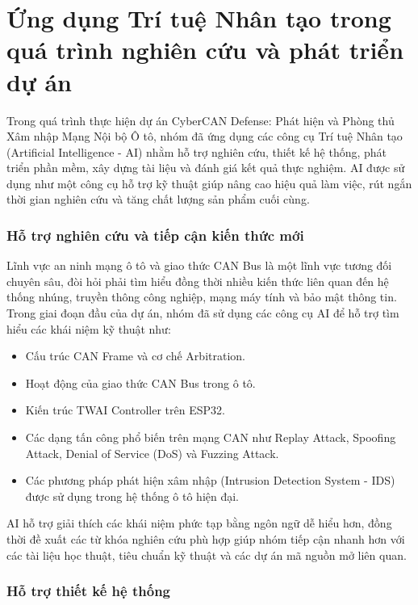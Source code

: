 \chapter{Ứng dụng Trí tuệ Nhân tạo trong quá trình nghiên cứu và phát triển dự án}

Trong quá trình thực hiện dự án CyberCAN Defense: Phát hiện và Phòng thủ Xâm nhập Mạng Nội bộ Ô tô, nhóm đã ứng dụng các công cụ Trí tuệ Nhân tạo (Artificial Intelligence - AI) nhằm hỗ trợ nghiên cứu, thiết kế hệ thống, phát triển phần mềm, xây dựng tài liệu và đánh giá kết quả thực nghiệm. AI được sử dụng như một công cụ hỗ trợ kỹ thuật giúp nâng cao hiệu quả làm việc, rút ngắn thời gian nghiên cứu và tăng chất lượng sản phẩm cuối cùng.

\subsection{Hỗ trợ nghiên cứu và tiếp cận kiến thức mới}

Lĩnh vực an ninh mạng ô tô và giao thức CAN Bus là một lĩnh vực tương đối chuyên sâu, đòi hỏi phải tìm hiểu đồng thời nhiều kiến thức liên quan đến hệ thống nhúng, truyền thông công nghiệp, mạng máy tính và bảo mật thông tin. Trong giai đoạn đầu của dự án, nhóm đã sử dụng các công cụ AI để hỗ trợ tìm hiểu các khái niệm kỹ thuật như:

\begin{itemize}
	\item Cấu trúc CAN Frame và cơ chế Arbitration.
	\item Hoạt động của giao thức CAN Bus trong ô tô.
	\item Kiến trúc TWAI Controller trên ESP32.
	\item Các dạng tấn công phổ biến trên mạng CAN như Replay Attack, Spoofing Attack, Denial of Service (DoS) và Fuzzing Attack.
	\item Các phương pháp phát hiện xâm nhập (Intrusion Detection System - IDS) được sử dụng trong hệ thống ô tô hiện đại.
\end{itemize}

AI hỗ trợ giải thích các khái niệm phức tạp bằng ngôn ngữ dễ hiểu hơn, đồng thời đề xuất các từ khóa nghiên cứu phù hợp giúp nhóm tiếp cận nhanh hơn với các tài liệu học thuật, tiêu chuẩn kỹ thuật và các dự án mã nguồn mở liên quan.

\subsection{Hỗ trợ thiết kế hệ thống}

